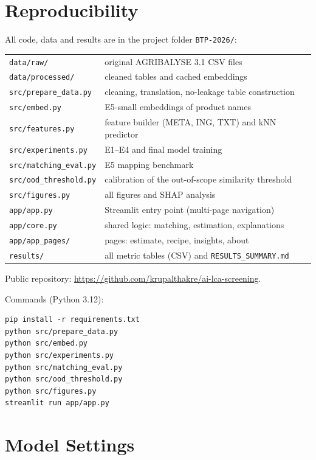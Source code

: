 \chapter{Reproducibility}
\label{app:repro}

All code, data and results are in the project folder \texttt{BTP-2026/}:

\begin{tabular}{@{}ll@{}}
\texttt{data/raw/} & original AGRIBALYSE 3.1 CSV files \\
\texttt{data/processed/} & cleaned tables and cached embeddings \\
\texttt{src/prepare\_data.py} & cleaning, translation, no-leakage table construction \\
\texttt{src/embed.py} & E5-small embeddings of product names \\
\texttt{src/features.py} & feature builder (META, ING, TXT) and kNN predictor \\
\texttt{src/experiments.py} & E1--E4 and final model training \\
\texttt{src/matching\_eval.py} & E5 mapping benchmark \\
\texttt{src/ood\_threshold.py} & calibration of the out-of-scope similarity threshold \\
\texttt{src/figures.py} & all figures and SHAP analysis \\
\texttt{app/app.py} & Streamlit entry point (multi-page navigation) \\
\texttt{app/core.py} & shared logic: matching, estimation, explanations \\
\texttt{app/app\_pages/} & pages: estimate, recipe, insights, about \\
\texttt{results/} & all metric tables (CSV) and \texttt{RESULTS\_SUMMARY.md} \\
\end{tabular}

\medskip
\noindent Public repository: \url{https://github.com/krupalthakre/ai-lca-screening}.

\medskip
\noindent Commands (Python 3.12):
\begin{verbatim}
pip install -r requirements.txt
python src/prepare_data.py
python src/embed.py
python src/experiments.py
python src/matching_eval.py
python src/ood_threshold.py
python src/figures.py
streamlit run app/app.py
\end{verbatim}

\chapter{Model Settings}
\label{app:settings}

